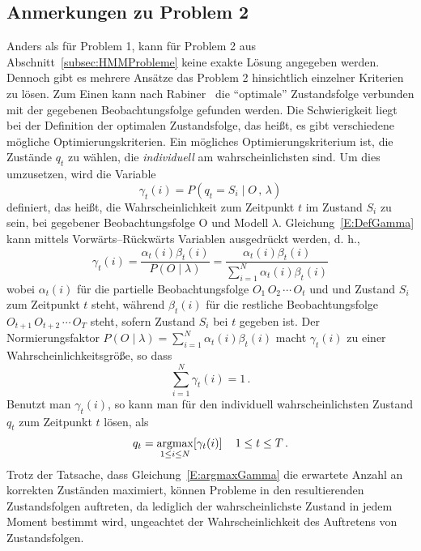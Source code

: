 \subsection{Anmerkungen zu Problem 2}
Anders als f\"ur Problem 1, kann f\"ur Problem 2 aus Abschnitt~\ref{subsec:HMMProbleme} keine exakte L\"osung angegeben werden. Dennoch gibt es mehrere Ans\"atze das Problem 2 hinsichtlich einzelner Kriterien zu l\"osen. Zum Einen kann nach Rabiner~\cite{bib:hmmrabiner} die \enquote{optimale} Zustandsfolge verbunden mit der gegebenen Beobachtungsfolge gefunden werden. Die Schwierigkeit liegt bei der Definition der optimalen Zustandsfolge, das hei\ss t, es gibt verschiedene m\"ogliche Optimierungskriterien. Ein m\"ogliches Optimierungskriterium ist, die Zust\"ande $q_t$ zu w\"ahlen, die \textit{individuell} am wahrscheinlichsten sind. Um dies umzusetzen, wird die Variable
\begin{equation}
\label{E:DefGamma}
\gamma_t(i) = P (q_t = S_i \mid O \, , \, \lambda)
\end{equation}
definiert, das hei\ss t, die Wahrscheinlichkeit zum Zeitpunkt $t$ im Zustand $S_i$ zu sein, bei gegebener Beobachtungsfolge O und Modell $\lambda$. Gleichung~\ref{E:DefGamma} kann mittels Vorw\"arts--R\"uckw\"arts Variablen ausgedr\"uckt werden, d. h.,
\begin{equation}
\label{E:FracGamma}
\gamma_t(i) = \frac{\alpha_t(i) \beta_t(i)}{P (O  \mid \lambda)} = \frac{\alpha_t(i) \beta_t(i)}{\sum_{i = 1}^{N} \alpha_t(i) \beta_t(i)}
\end{equation}
wobei $\alpha_t(i)$ f\"ur die partielle Beobachtungsfolge $O_1 \, O_2 \, \cdots \, O_t$  und  und Zustand $S_i$ zum Zeitpunkt $t$ steht, w\"ahrend $\beta_t(i)$ f\"ur die restliche Beobachtungsfolge $O_{t +1} \, O_{t + 2} \, \cdots \, O_T$ steht, sofern Zustand $S_i$ bei $t$ gegeben ist. Der Normierungsfaktor $P (O  \mid \lambda) = \sum_{i = 1}^{N} \alpha_t(i) \beta_t(i)$ macht $\gamma_t(i)$ zu einer Wahrscheinlichkeitsgr\"o\ss e, so dass 
\begin{equation}
\sum_{i = 1}^{N} \gamma_t(i) = 1 \, .
\end{equation}
Benutzt man $ \gamma_t(i)$, so kann man f\"ur den individuell wahrscheinlichsten Zustand $q_t$ zum Zeitpunkt $t$ l\"osen, als
\begin{align}
\label{E:argmaxGamma}
q_t =  \underset{1 \leq i \leq N}{\operatorname*{argmax}} [\gamma_t(i)] \, & & 1 \leq t \leq T \, .
\end{align}
Trotz der Tatsache, dass Gleichung~\ref{E:argmaxGamma} die erwartete Anzahl an korrekten Zust\"anden maximiert, k\"onnen Probleme in den resultierenden Zustandsfolgen auftreten, da lediglich der wahrscheinlichste Zustand in jedem Moment bestimmt wird, ungeachtet der Wahrscheinlichkeit des Auftretens von Zustandsfolgen.
